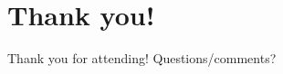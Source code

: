 \documentclass[logoontitle,tabu,supertabular,aspectratio=43]{preney-uwindsor-beamer}
\begin{document}

	\section*{Thank you!}
	\begin{frame}
		\begin{center}
			\huge Thank you for attending!  Questions/comments?
		\end{center}
	\end{frame}

%
%
%

\end{document}
